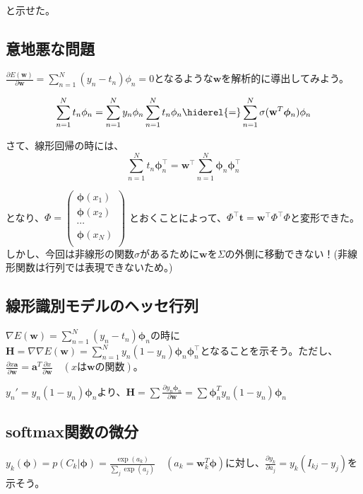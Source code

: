 と示せた。

\subsection*{意地悪な問題}
$\frac{\partial E(\mathbf{w})}{\partial \mathbf{w}} =  \sum_{n=1}^N (y_n - t_n) \phi_n = 0$となるような$\mathbf{w}$を解析的に導出してみよう。

\begin{dmath*}
\sum_{n=1}^N t_n \phi_n = \sum_{n=1}^N y_n \phi_n \\
\sum_{n=1}^N t_n \phi_n \hiderel{=} \sum_{n=1}^N  \sigma(\mathbf{w}^T \bm{\phi}_n) \phi_n
\end{dmath*}

さて、線形回帰の時には、
\begin{equation}
	\sum_{n=1}^N t_n \bm{\phi}_n^{\top} =  \mathbf{w}^{\top} \sum_{n=1}^N \bm{\phi}_n \bm{\phi}_n^{\top}
\end{equation}

となり、$\Phi = \begin{pmatrix} 
\bm{\phi}(x_1) \\
\bm{\phi}(x_2) \\
\cdots \\
\bm{\phi}(x_N) \\
\end{pmatrix}$ とおくことによって、$\Phi^{\top} \mathbf{t} = \mathbf{w}^{\top} \Phi^{\top} \Phi$と変形できた。しかし、今回は非線形の関数$\sigma$があるために$\mathbf{w}$を$\Sigma$の外側に移動できない！(非線形関数は行列では表現できないため。)


\subsection*{線形識別モデルのヘッセ行列}

$\nabla E (\mathbf{w} ) = \sum_{n=1}^N (y_n - t_n) \bm{\phi}_n $の時に$\mathbf{H} = \nabla \nabla E(\mathbf{w}) = \sum_{n=1}^N y_n (1 - y_n) \bm{\phi}_n \bm{\phi}_n^{\top}$となることを示そう。ただし、$\frac{\partial x \mathbf{a}}{\partial \mathbf{w}} = \mathbf{a}^T \frac{\partial x}{\partial \mathbf{w}} \quad (x \text{は} \mathbf{w} \text{の関数})$。

$y_n' = y_n(1-y_n)\bm{\phi}_n$より、$\mathbf{H} = \sum \frac{\partial  y_n \bm{\phi}_n}{\partial \mathbf{w}} = \sum \bm{\phi}_n^T y_n(1 - y_n) {\bm{\phi}_n}$

\subsection*{softmax関数の微分}
$ y_k(\bm{\phi})  =  p(C_k | \bm{\phi}) = \frac{\exp(a_{k})}{\sum_j \exp(a_{j}) } \quad (a_k = \mathbf{w}_k^T \bm{\phi}) $に対し、$\frac{\partial y_k}{\partial a_j} = y_k (I_{kj} - y_j)$を示そう。

